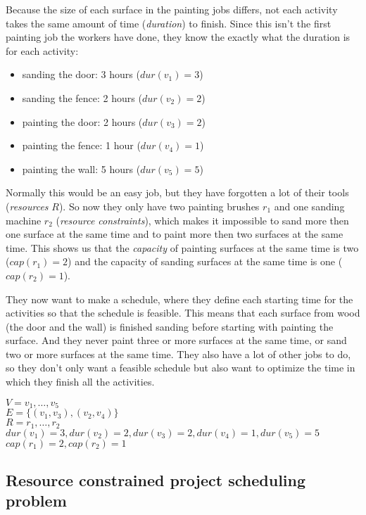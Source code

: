 \documentclass{article}
\newcommand{\capa}[1]{\ensuremath{cap(r_{#1})}} %
\newcommand{\dur}[1]{\ensuremath{dur(v_{#1})}} %
\begin{document}
Because the size of each surface in the painting jobs differs, not each activity takes the same amount of time (\emph{duration}) to finish.
Since this isn't the first painting job the workers have done, they know the exactly what the duration is for each activity:
\begin{itemize}
\item sanding the door: 3 hours ($\dur{1} = 3$)
\item sanding the fence: 2 hours ($\dur{2} = 2$)
\item painting the door: 2 hours ($\dur{3} = 2$)
\item painting the fence: 1 hour ($\dur{4} = 1$)
\item painting the wall: 5 hours ($\dur{5} = 5$)
\end{itemize}
Normally this would be an easy job, but they have forgotten a lot of their tools (\emph{resources} $R$).
So now they only have two painting brushes $r_1$ and one sanding machine $r_2$ (\emph{resource constraints}), which makes it impossible to sand more then one surface at the same time and to paint more then two surfaces at the same time.
This shows us that the \emph{capacity} of painting surfaces at the same time is two ($\capa{1} = 2$) and the capacity of sanding surfaces at the same time is one  ($\capa{2} = 1$).

They now want to make a schedule, where they define each starting time for the activities so that the schedule is feasible.
This means that each surface from wood (the door and the wall) is finished sanding before starting with painting the surface.
And they never paint three or more surfaces at the same time, or sand two or more surfaces at the same time.
They also have a lot of other jobs to do, so they don't only want a feasible schedule but also want to optimize the time in which they finish all the activities.

$V = v_1, \ldots, v_5$\\
$E = \{(v_1, v_3), (v_2, v_4)\}$\\
$R = r_1, \ldots, r_2$\\
$\dur{1} = 3, \dur{2} = 2, \dur{3} = 2, \dur{4} = 1, \dur{5} = 5$\\
$\capa{1} = 2, \capa{2} = 1$



\subsection{Resource constrained project scheduling problem}
\end{document}
